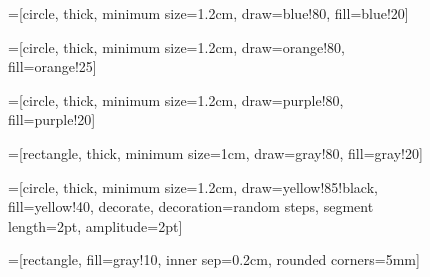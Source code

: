 \begin{figure}[htbp]
\centering
=[circle,
                   thick,
                   minimum size=1.2cm,
                   draw=blue!80,
                   fill=blue!20]

=[circle,
                         thick,
                         minimum size=1.2cm,
                         draw=orange!80,
                         fill=orange!25]

=[circle,
                   thick,
                   minimum size=1.2cm,
                   draw=purple!80,
                   fill=purple!20]

=[rectangle,
                   thick,
                   minimum size=1cm,
                   draw=gray!80,
                   fill=gray!20]

=[circle,
                   thick,
                   minimum size=1.2cm,
                   draw=yellow!85!black,
                   fill=yellow!40,
                   decorate,
                   decoration={random steps,
                               segment length=2pt,
                               amplitude=2pt}]

=[rectangle,
                        fill=gray!10,
                        inner sep=0.2cm,
                        rounded corners=5mm]

\begin{tikzpicture}[>=latex,text height=1.5ex,text depth=0.25ex]


\end{tikzpicture}
\end{figure}
